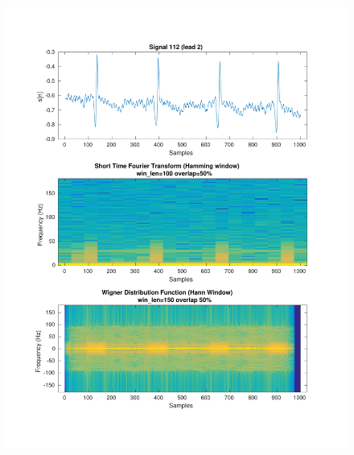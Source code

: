\documentclass[11pt,a4paper]{article}
\begin{document}
\begin{figure}[H]
\centering
\begin{minipage}{0.48\textwidth}
	\centering
	\includegraphics[width=\textwidth]{fig/112l2_stft_wdf.pdf}
\end{minipage}
\begin{minipage}{0.48\textwidth}
	\centering

\end{minipage}
\end{figure}
\end{document}
